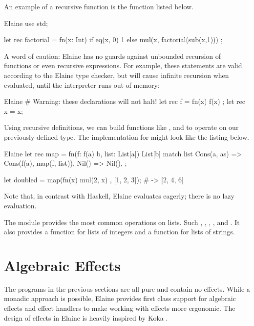An example of a recursive function is the  function listed below.

\begin{lst}{Elaine}
use std;

let rec factorial = fn(x: Int) {
    if eq(x, 0) {
        1
    } else {
        mul(x, factorial(sub(x,1)))
    }
};
\end{lst}

A word of caution: Elaine has no guards against unbounded recursion of functions or even recursive expressions. For example, these statements are valid according to the Elaine type checker, but will cause infinite recursion when evaluated, until the interpreter runs out of memory:

\begin{lst}{Elaine}
# Warning: these declarations will not halt!
let rec f = fn(x) { f(x) };
let rec x = x;
\end{lst}

Using recursive definitions, we can build functions like ,  and  to operate on our previously defined  type. The implementation for  might look like the listing below.

\begin{lst}{Elaine}
let rec map = fn(f: f(a) b, list: List[a]) List[b] {
    match list {
        Cons(a, as) => Cons(f(a), map(f, list)),
        Nil() => Nil(),
    }
};

let doubled = map(fn(x) { mul(2, x) }, [1, 2, 3]); # -> [2, 4, 6]
\end{lst}

Note that, in contrast with Haskell, Elaine evaluates  eagerly; there is no lazy evaluation.

The  module provides the most common operations on lists. Such , , , ,  and . It also provides a  function for lists of integers and a  function for lists of strings.

\section{Algebraic Effects}

The programs in the previous sections are all pure and contain no effects. While a monadic approach is possible, Elaine provides first class support for algebraic effects and effect handlers to make working with effects more ergonomic. The design of effects in Elaine is heavily inspired by Koka \citationneeded.

